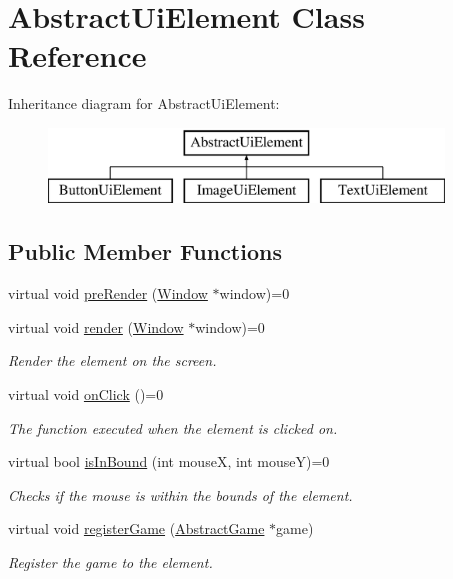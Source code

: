 \hypertarget{class_abstract_ui_element}{}\section{Abstract\+Ui\+Element Class Reference}
\label{class_abstract_ui_element}
Inheritance diagram for Abstract\+Ui\+Element\+:\begin{figure}[H]
\begin{center}
\leavevmode
\includegraphics[height=2.000000cm]{class_abstract_ui_element}
\end{center}
\end{figure}
\subsection*{Public Member Functions}
\begin{DoxyCompactItemize}
\item 
virtual void \mbox{\hyperlink{class_abstract_ui_element_a859f627ab385e9d3bf6ce8db40607cdb}{pre\+Render}} (\mbox{\hyperlink{class_window}{Window}} $\ast$window)=0
\item 
virtual void \mbox{\hyperlink{class_abstract_ui_element_aea66ce333323cf2d5e12d4de9515de7b}{render}} (\mbox{\hyperlink{class_window}{Window}} $\ast$window)=0
\begin{DoxyCompactList}\small\item\em Render the element on the screen. \end{DoxyCompactList}\item 
virtual void \mbox{\hyperlink{class_abstract_ui_element_a42296c15c9e70b6ac7fda0b1862612af}{on\+Click}} ()=0
\begin{DoxyCompactList}\small\item\em The function executed when the element is clicked on. \end{DoxyCompactList}\item 
virtual bool \mbox{\hyperlink{class_abstract_ui_element_ad2c415461cd7e8c1ee50b1105eb84685}{is\+In\+Bound}} (int mouseX, int mouseY)=0
\begin{DoxyCompactList}\small\item\em Checks if the mouse is within the bounds of the element. \end{DoxyCompactList}\item 
virtual void \mbox{\hyperlink{class_abstract_ui_element_aea8a32a77e77f601ca114b8738072079}{register\+Game}} (\mbox{\hyperlink{class_abstract_game}{Abstract\+Game}} $\ast$game)
\begin{DoxyCompactList}\small\item\em Register the game to the element. \end{DoxyCompactList}\end{DoxyCompactItemize}
